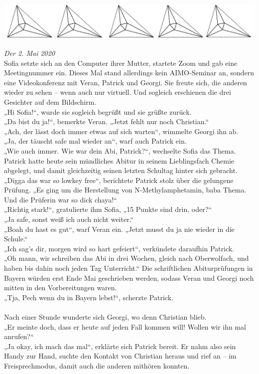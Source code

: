 \documentclass[oneside]{memoir}
\newcommand{\parasep}{
\bigskip
\bigskip
\begin{center} 
   \includegraphics[scale=.08]{parasep5.jpg} 
\end{center}
\bigskip
\bigskip
}
\begin{document}
\parasep

\textit{Der 2. Mai 2020} \\
Sofia setzte sich an den Computer ihrer Mutter, startete Zoom und gab eine Meetingnummer ein. Dieses Mal stand allerdings kein AIMO-Seminar an, sondern eine Videokonferenz mit Veran, Patrick und Georgi. Sie freute sich, die anderen wieder zu sehen – wenn auch nur virtuell. Und sogleich erschienen die drei Gesichter auf dem Bildschirm. \\
„Hi Sofia!“, wurde sie sogleich begrüßt und sie grüßte zurück. \\
„Da bist du ja!“, bemerkte Veran. „Jetzt fehlt nur noch Christian.“ \\
„Ach, der lässt doch immer etwas auf sich warten“, wimmelte Georgi ihn ab. \\
„Ja, der täuscht safe mal wieder an“, warf auch Patrick ein. \\
„Wie auch immer. Wie war dein Abi, Patrick?“, wechselte Sofia das Thema. Patrick hatte 
heute sein mündliches Abitur in seinem Lieblingsfach Chemie abgelegt, und damit 
gleichzeitig seinen letzten Schultag hinter sich gebracht. \\
„Digga das war so lowkey free“, berichtete Patrick stolz über die gelungene Prüfung. „Es ging um die Herstellung von N-Methylamphetamin, baba Thema. Und die Prüferin war so dick chaya!“ \\
„Richtig stark!“, gratulierte ihm Sofia, „15 Punkte sind drin, oder?“ \\
„Ja safe, sonst weiß ich auch nicht weiter.“ \\
„Boah du hast es gut“, warf Veran ein. „Jetzt musst du ja nie wieder in die Schule.“ \\
„Ich sag's dir, morgen wird so hart gefeiert“, verkündete daraufhin Patrick. \\
„Oh mann, wir schreiben das Abi in drei Wochen, gleich nach Oberwolfach, und haben bis 
dahin noch jeden Tag Unterricht.“ Die schriftlichen Abiturprüfungen in Bayern würden erst 
Ende Mai geschrieben werden, sodass Veran und Georgi noch mitten in den Vorbereitungen waren. \\
„Tja, Pech wenn du in Bayern lebst!“, scherzte Patrick. \\ \\
Nach einer Stunde wunderte sich Georgi, wo denn Christian blieb. \\
„Er meinte doch, dass er heute auf jeden Fall kommen will! Wollen wir ihn mal anrufen?“ \\
„Ja okay, ich mach das mal“, erklärte sich Patrick bereit. Er nahm also sein Handy zur Hand, suchte den Kontakt von Christian heraus und rief an -- im Freisprechmodus, damit auch die anderen mithören konnten.
\end{document}
